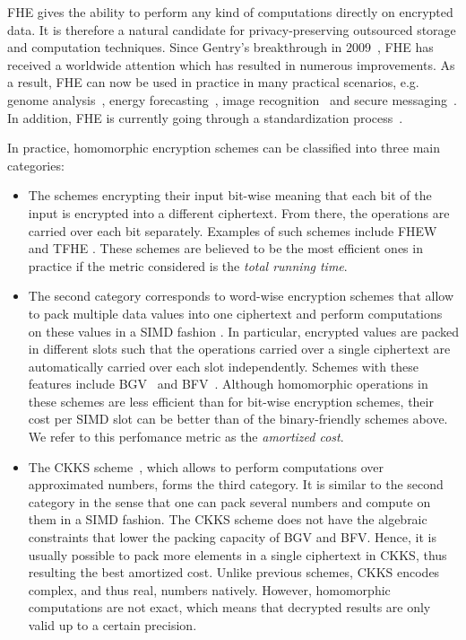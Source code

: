 \ac{FHE} gives the ability to perform any kind of computations directly on encrypted data. 
It is therefore a natural candidate for privacy-preserving outsourced storage and computation techniques. 
Since Gentry's breakthrough in 2009~\cite{STOC:Gentry09}, FHE has received a worldwide attention which has resulted in numerous improvements. 
As a result, \ac{FHE} can now be used in practice in many practical scenarios, e.g. genome analysis~\cite{KL15}, energy forecasting~\cite{BCIV17}, image recognition~\cite{BMMP18} and secure messaging~\cite{SP:ACLS18}. 
In addition, FHE is currently going through a standardization process~\cite{HomomorphicEncryptionSecurityStandard}.
  
In practice, homomorphic encryption schemes can be classified into three main categories:
\begin{itemize}
	\item The schemes encrypting their input bit-wise meaning that each bit of the input is encrypted into a different ciphertext. 
	From there, the operations are carried over each bit separately. 
	Examples of such schemes include FHEW \cite{DM15} and TFHE \cite{CGGI16}. 
	These schemes are believed to be the most efficient ones in practice if the metric considered is the \emph{total running time}.
	\item The second category corresponds to word-wise encryption schemes that allow to pack multiple data values into one ciphertext and perform computations on these values in a \ac{SIMD} fashion \cite{SV14}. 
	In particular, encrypted values are packed in different slots such that the operations carried over a single ciphertext are automatically carried over each slot independently. 
	Schemes with these features include BGV~\cite{BGV12} and BFV~\cite{C:Brakerski12,FV12}. 
	Although homomorphic operations in these schemes are less efficient than for bit-wise encryption schemes, their cost per SIMD slot can be better than of the binary-friendly schemes above. 
	We refer to this perfomance metric as the \emph{amortized cost}.
	\item The CKKS scheme~\cite{CKKS17}, which allows to perform computations over approximated numbers, forms the third category. 
	It is similar to the second category in the sense that one can pack several numbers and compute on them in a SIMD fashion.
	The CKKS scheme does not have the algebraic constraints that lower the packing capacity of BGV and BFV. 
	Hence, it is usually possible to pack more elements in a single ciphertext in CKKS, thus resulting the best amortized cost. 
	Unlike previous schemes, CKKS encodes complex, and thus real, numbers natively. 
	However, homomorphic computations are not exact, which means that decrypted results are only valid up to a certain precision. 
\end{itemize}

